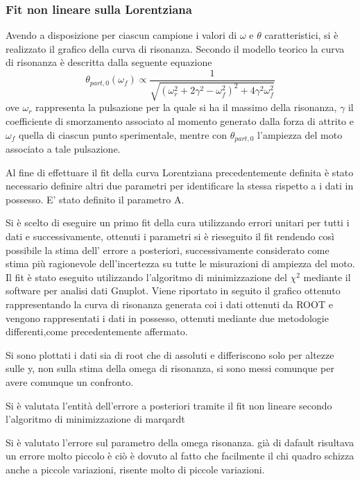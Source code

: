 \documentclass[a4paper,11pt,oneside]{article}
\begin{document}
\subsubsection{Fit non lineare sulla Lorentziana}
Avendo a disposizione per ciascun campione i valori di $\omega$ e $\theta$ caratteristici, si è realizzato il grafico della curva di risonanza. Secondo il modello teorico la curva di risonanza è descritta dalla seguente equazione
\begin{equation*}
    \theta_{part, 0}(\omega_{f}) \propto \frac{1}{\sqrt{(\omega_{r}^2+ 2\gamma^2-\omega_{f}^2)^2+4\gamma^2\omega_{f}^2}}
\end{equation*}
ove $\omega_{r}$ rappresenta la pulsazione per la quale si ha il massimo della risonanza, $\gamma$ il coefficiente di smorzamento associato al momento generato dalla forza di attrito e $\omega_{f}$ quella di ciascun punto sperimentale, mentre con $\theta_{part,0}$ l'ampiezza del moto associato a tale pulsazione.

Al fine di effettuare il fit della curva Lorentziana precedentemente definita è stato necessario definire altri due parametri per identificare la stessa rispetto a i dati in possesso. E' stato definito il parametro A.

Si è scelto di eseguire un primo fit della cura utilizzando errori unitari per tutti i dati e successivamente, ottenuti i parametri si è rieseguito il fit rendendo così possibile la stima dell' errore a posteriori, successivamente considerato come stima più ragionevole dell'incertezza su tutte le misurazioni di ampiezza del moto.
Il fit è stato eseguito utilizzando l'algoritmo di minimizzazione del $\chi^2$ mediante il software per analisi dati Gnuplot.
Viene riportato in seguito il grafico ottenuto  rappresentando la curva di risonanza generata coi i dati ottenuti da ROOT e vengono rappresentati i dati in possesso, ottenuti mediante due metodologie differenti,come precedentemente affermato.

Si sono plottati i dati sia di root che di assoluti e differiscono solo per altezze sulle y, non sulla stima della omega di risonanza, si sono messi comunque per avere comunque un confronto. 

Si è valutata l'entità dell'errore a posteriori tramite il fit non lineare secondo l'algoritmo di minimizzazione di marqardt

Si è valutato l'errore sul parametro della omega risonanza. già di dafault risultava un errore molto piccolo è ciò è dovuto al fatto che facilmente il chi quadro schizza anche a piccole variazioni, risente molto di piccole variazioni.
\end{document}
